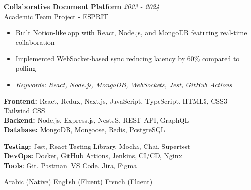\documentclass[11pt,a4paper]{article}
\begin{document}

\textbf{Collaborative Document Platform} \hfill \textit{2023 - 2024}\\[-2pt]
Academic Team Project - ESPRIT\\[-5pt]
\begin{itemize}[leftmargin=8pt,itemsep=1pt,topsep=2pt]
  \item Built Notion-like app with React, Node.js, and MongoDB featuring real-time collaboration
  \item Implemented WebSocket-based sync reducing latency by 60\% compared to polling
  \item[] \textit{\footnotesize Keywords: React, Node.js, MongoDB, WebSockets, Jest, GitHub Actions}
\end{itemize}\vspace{3pt}

{\small
\begin{minipage}[t]{0.48\textwidth}
  \textbf{Frontend:} React, Redux, Next.js, JavaScript, TypeScript, HTML5, CSS3, Tailwind CSS\\[1.5pt]
  \textbf{Backend:} Node.js, Express.js, NestJS, REST API, GraphQL\\[1.5pt]
  \textbf{Database:} MongoDB, Mongoose, Redis, PostgreSQL
\end{minipage}
\hfill
\begin{minipage}[t]{0.48\textwidth}
  \textbf{Testing:} Jest, React Testing Library, Mocha, Chai, Supertest\\[1.5pt]
  \textbf{DevOps:} Docker, GitHub Actions, Jenkins, CI/CD, Nginx\\[1.5pt]
  \textbf{Tools:} Git, Postman, VS Code, Jira, Figma
\end{minipage}
}

Arabic (Native) \textbar{} English (Fluent) \textbar{} French (Fluent)
\end{document}
